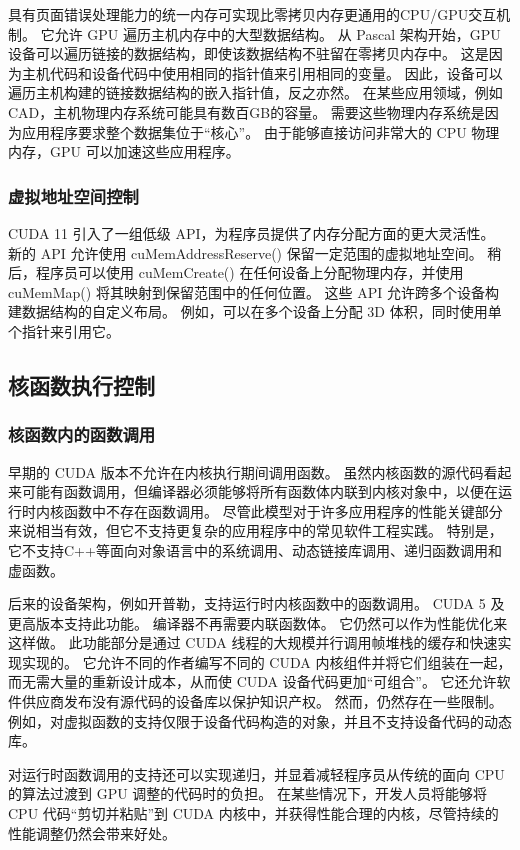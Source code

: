 具有页面错误处理能力的统一内存可实现比零拷贝内存更通用的CPU/GPU交互机制。 它允许 GPU 遍历主机内存中的大型数据结构。 
从 Pascal 架构开始，GPU 设备可以遍历链接的数据结构，即使该数据结构不驻留在零拷贝内存中。 
这是因为主机代码和设备代码中使用相同的指针值来引用相同的变量。 
因此，设备可以遍历主机构建的链接数据结构的嵌入指针值，反之亦然。 
在某些应用领域，例如CAD，主机物理内存系统可能具有数百GB的容量。 
需要这些物理内存系统是因为应用程序要求整个数据集位于“核心”。 
由于能够直接访问非常大的 CPU 物理内存，GPU 可以加速这些应用程序。

\subsubsection{虚拟地址空间控制}
CUDA 11 引入了一组低级 API，为程序员提供了内存分配方面的更大灵活性。 
新的 API 允许使用 cuMemAddressReserve() 保留一定范围的虚拟地址空间。 
稍后，程序员可以使用 cuMemCreate() 在任何设备上分配物理内存，并使用 cuMemMap() 将其映射到保留范围中的任何位置。 
这些 API 允许跨多个设备构建数据结构的自定义布局。 例如，可以在多个设备上分配 3D 体积，同时使用单个指针来引用它。

\subsection{核函数执行控制}
\subsubsection{核函数内的函数调用}
早期的 CUDA 版本不允许在内核执行期间调用函数。 
虽然内核函数的源代码看起来可能有函数调用，但编译器必须能够将所有函数体内联到内核对象中，以便在运行时内核函数中不存在函数调用。 
尽管此模型对于许多应用程序的性能关键部分来说相当有效，但它不支持更复杂的应用程序中的常见软件工程实践。 
特别是，它不支持C++等面向对象语言中的系统调用、动态链接库调用、递归函数调用和虚函数。

后来的设备架构，例如开普勒，支持运行时内核函数中的函数调用。 CUDA 5 及更高版本支持此功能。 编译器不再需要内联函数体。 
它仍然可以作为性能优化来这样做。 此功能部分是通过 CUDA 线程的大规模并行调用帧堆栈的缓存和快速实现实现的。 
它允许不同的作者编写不同的 CUDA 内核组件并将它们组装在一起，而无需大量的重新设计成本，从而使 CUDA 设备代码更加“可组合”。 
它还允许软件供应商发布没有源代码的设备库以保护知识产权。 然而，仍然存在一些限制。 
例如，对虚拟函数的支持仅限于设备代码构造的对象，并且不支持设备代码的动态库。

对运行时函数调用的支持还可以实现递归，并显着减轻程序员从传统的面向 CPU 的算法过渡到 GPU 调整的代码时的负担。 
在某些情况下，开发人员将能够将 CPU 代码“剪切并粘贴”到 CUDA 内核中，并获得性能合理的内核，尽管持续的性能调整仍然会带来好处。

